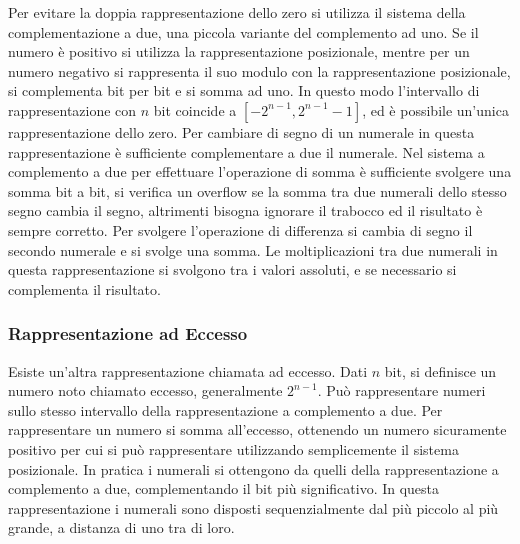\documentclass{article}
\numberwithin{equation}{subsection}
\begin{document}
Per evitare la doppia rappresentazione dello zero si utilizza il sistema della complementazione a due, una piccola variante del complemento ad uno. Se il numero è positivo si 
utilizza la rappresentazione posizionale, mentre per un numero negativo si rappresenta il suo modulo con la rappresentazione posizionale, si complementa bit per bit e si somma ad 
uno. In questo modo l'intervallo di rappresentazione con $n$ bit coincide a $[-2^{n-1},2^{n-1}-1]$, ed è possibile un'unica rappresentazione dello zero. Per cambiare di segno 
di un numerale in questa rappresentazione è sufficiente complementare a due il numerale. 
Nel sistema a complemento a due per effettuare l'operazione di somma è sufficiente svolgere una somma bit a bit, si verifica un overflow se la somma tra due numerali dello 
stesso segno cambia il segno, altrimenti bisogna ignorare il trabocco ed il risultato è sempre corretto. Per svolgere l'operazione di differenza si cambia di segno il secondo numerale e si svolge una somma.  
Le moltiplicazioni tra due numerali in questa rappresentazione si svolgono tra i valori assoluti, e se necessario si complementa il risultato. 

\subsubsection{Rappresentazione ad Eccesso}
Esiste un'altra rappresentazione chiamata ad eccesso. Dati $n$ bit, si definisce un numero noto chiamato eccesso, generalmente $2^{n-1}$. Può rappresentare numeri sullo stesso 
intervallo della rappresentazione a complemento a due. Per rappresentare un numero si somma all'eccesso, ottenendo un numero sicuramente positivo per cui si può rappresentare 
utilizzando semplicemente il sistema posizionale. In pratica i numerali si ottengono da quelli della rappresentazione a complemento a due, complementando il bit più significativo. 
In questa rappresentazione i numerali sono disposti sequenzialmente dal più piccolo al più grande, a distanza di uno tra di loro.  
\end{document}
